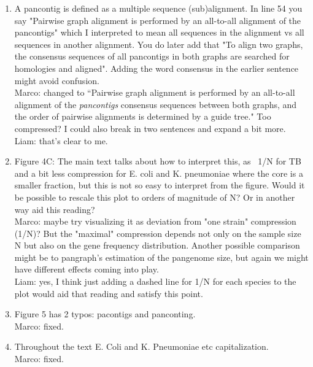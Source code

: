 \documentclass[aps,rmp,onecolumn]{revtex4-1}
\newcommand{\Marco}[1]{{\color{gray}Marco: #1}}
\newcommand{\Liam}[1]{{\color{teal}Liam: #1}}
\begin{document}
\begin{enumerate}
      \item A pancontig is defined as a multiple sequence (sub)alignment. In line 54 you say "Pairwise graph alignment is performed by an all-to-all alignment of the pancontigs" which I interpreted to mean all sequences in the alignment vs all sequences in another alignment. You do later add that "To align two graphs, the consensus sequences of all pancontigs in both graphs are searched for homologies and aligned". Adding the word consensus in the earlier sentence might avoid confusion.\\
            \Marco{changed to ``Pairwise graph alignment is performed by an all-to-all alignment of the \emph{pancontigs} consensus sequences between both graphs, and the order of pairwise alignments is determined by a guide tree." Too compressed? I could also break in two sentences and expand a bit more.}\\
            \Liam{that's clear to me.}

      \item Figure 4C: The main text talks about how to interpret this, as ~1/N for TB and a bit less compression for E. coli and K. pneumoniae where the core is a smaller fraction, but this is not so easy to interpret from the figure. Would it be possible to rescale this plot to orders of magnitude of N? Or in another way aid this reading?\\
            \Marco{maybe try visualizing it as deviation from "one strain" compression (1/N)? But the "maximal" compression depends not only on the sample size N but also on the gene frequency distribution. Another possible comparison might be to pangraph's estimation of the pangenome size, but again we might have different effects coming into play.}\\
            \Liam{yes, I think just adding a dashed line for 1/N for each species to the plot would aid that reading and satisfy this point.}

      \item Figure 5 has 2 typos: pacontigs and panconting.\\
            \Marco{fixed.}

      \item Throughout the text E. Coli and K. Pneumoniae etc capitalization.\\
            \Marco{fixed.}


\end{enumerate}
\end{document}
